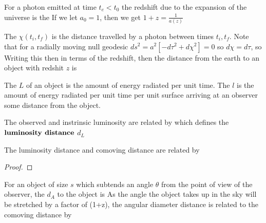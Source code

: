 \documentclass{article}
\begin{document}
\begin{definition}
For a photon emitted at time $t_e < t_0$ the redshift due to the expansion of the universe is the 
If we let $a_0=1$, then we get $1+z = \frac{1}{a(z)}$
\end{definition}

\begin{definition}
The  $\chi(t_i,t_f)$ is the distance travelled by a photon between times $t_i,t_f$. Note that for a radially moving null geodesic $ds^2 = a^2[-d\tau^2 + d\chi^2] = 0$ so $d\chi=d\tau$, so 
Writing this then in terms of the redshift, then the distance from the earth to an object with redshit $z$ is   
\end{definition}

\begin{definition}[Luminosity]
The  $L$ of an object is the amount of energy radiated per unit time. The  $l$ is the amount of energy radiated per unit time per unit surface arriving at an observer some distance from the object.
\end{definition}

\begin{definition}
The observed and instrinsic luminosity are related by 
which defines the $\textbf{luminosity distance}$ $d_L$
 \end{definition}
 
 \begin{prop}
 The luminosity distance and comoving distance are related by 
 \end{prop}
\begin{proof}
\end{proof}

\begin{definition}
For an object of size $s$ which subtends an angle $\theta$ from the point of view of the observer, the  $d_A$ to the object is 
As the angle the object takes up in the sky will be stretched by a factor of (1+z), the angular diameter distance is related to the comoving distance by 
\end{definition}
\end{document}
